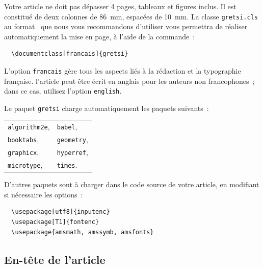 \documentclass[francais]{gretsi}
\begin{document}
Votre article ne doit pas dépasser 4 pages, tableaux et figures inclus.
Il est constitué de deux colonnes de 86~mm, espacées de 10~mm.
La classe \texttt{gretsi.cls} au format \LaTeXe\ que nous vous recommandons d'utiliser
vous permettra de réaliser automatiquement la mise en page, à l'aide de la commande~:
\begin{verbatim}
  \documentclass[francais]{gretsi}
\end{verbatim}
L'option \texttt{francais} gère tous les aspects liés à la rédaction et la typographie française.
l'article peut être écrit en anglais pour les auteurs non francophones~;
dans ce cas, utilisez l'option \texttt{english}.

Le paquet \texttt{gretsi} charge automatiquement les paquets suivants~:
\begin{center}
  \begin{tabular}{l@{\hspace*{15mm}}l}
    \texttt{algorithm2e}, &
    \texttt{babel}, \\
    \texttt{booktabs}, &
    \texttt{geometry}, \\
    \texttt{graphicx}, &
    \texttt{hyperref}, \\
    \texttt{microtype}, &
    \texttt{times}. \\
  \end{tabular}
\end{center}

D'autres paquets sont à charger dans le code source de votre article,
en modifiant si nécessaire les options~:
\begin{verbatim}
  \usepackage[utf8]{inputenc}
  \usepackage[T1]{fontenc}
  \usepackage{amsmath, amssymb, amsfonts}
\end{verbatim}

\subsection{En-tête de l'article}
\end{document}
